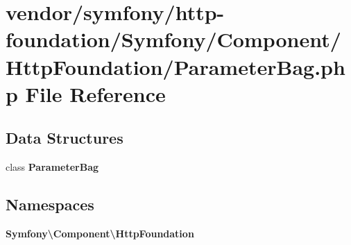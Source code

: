 \section{vendor/symfony/http-\/foundation/\+Symfony/\+Component/\+Http\+Foundation/\+Parameter\+Bag.php File Reference}
\label{_parameter_bag_8php}
\subsection*{Data Structures}
\begin{DoxyCompactItemize}
\item 
class {\bf Parameter\+Bag}
\end{DoxyCompactItemize}
\subsection*{Namespaces}
\begin{DoxyCompactItemize}
\item 
 {\bf Symfony\textbackslash{}\+Component\textbackslash{}\+Http\+Foundation}
\end{DoxyCompactItemize}
